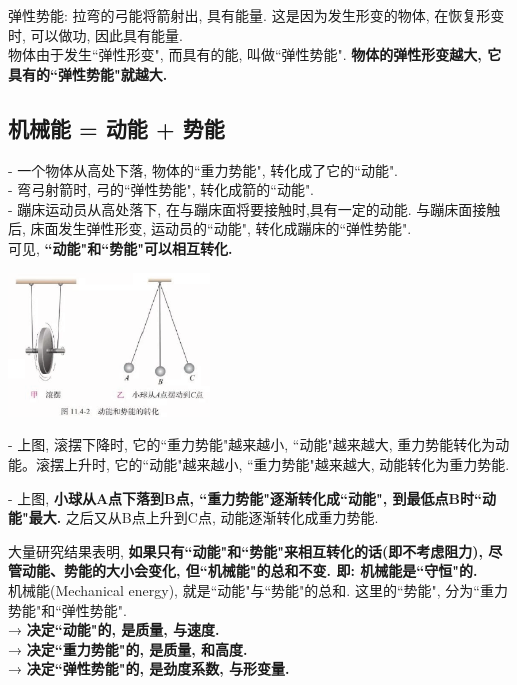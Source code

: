 \documentclass[UTF8]{ctexart}
\begin{document}
	弹性势能: 拉弯的弓能将箭射出, 具有能量. 这是因为发生形变的物体, 在恢复形变时, 可以做功, 因此具有能量.  \\
	物体由于发生``弹性形变", 而具有的能, 叫做``弹性势能". \textbf{物体的弹性形变越大, 它具有的``弹性势能"就越大.}
	
	
	\vspace{1em} 
	
	
	
	\subsection{机械能 = 动能 + 势能}
	
	- 一个物体从高处下落, 物体的``重力势能", 转化成了它的``动能". \\
	- 弯弓射箭时, 弓的``弹性势能", 转化成箭的``动能". \\
	- 蹦床运动员从高处落下, 在与蹦床面将要接触时,具有一定的动能. 与蹦床面接触后, 床面发生弹性形变, 运动员的``动能", 转化成蹦床的``弹性势能". \\
	可见, \textbf{``动能"和``势能"可以相互转化.} \\
	
	\begin{tcolorbox}[title = {例},boxrule={0.1em},colframe={black!10}, colback={black!3},colbacktitle={black!10},coltitle={black}]
	\includegraphics[width=0.4\textwidth]{img/0046.png}
	
	- 上图, 滚摆下降时, 它的``重力势能"越来越小, ``动能"越来越大, 重力势能转化为动能。滚摆上升时, 它的``动能"越来越小, ``重力势能"越来越大, 动能转化为重力势能.
	
	- 上图, \textbf{小球从A点下落到B点, ``重力势能"逐渐转化成``动能", 到最低点B时``动能"最大.} 之后又从B点上升到C点, 动能逐渐转化成重力势能.	
	\end{tcolorbox}

	大量研究结果表明, \textbf{如果只有``动能"和``势能"来相互转化的话(即不考虑阻力), 尽管动能、势能的大小会变化, 但``机械能"的总和不变. 即: 机械能是``守恒"的.} \\
	
	
	机械能(Mechanical energy), 就是``动能"与``势能"的总和. 这里的``势能", 分为``重力势能"和``弹性势能".  \\
	→ \textbf{决定``动能"的, 是质量, 与速度.} \\
	→ \textbf{决定``重力势能"的, 是质量, 和高度.} \\
	→ \textbf{决定``弹性势能"的, 是劲度系数, 与形变量.} \\
	
\end{document}
